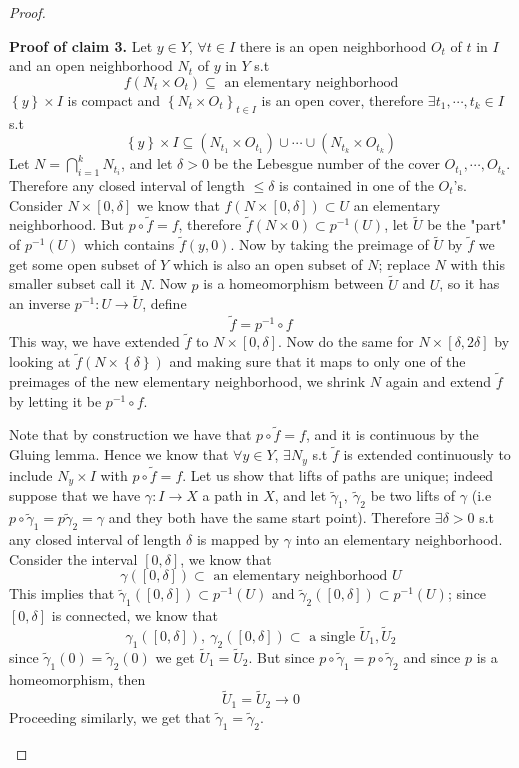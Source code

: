 \documentclass[11pt,a4paper]{article}
\theoremstyle{definition}
\theoremstyle{plain}
\theoremstyle{remark}
\renewcommand{\set}[1]{\left\{ #1 \right\}}
\newcommand{\1}{\mathbbm{1}}
\begin{document}
\begin{proof}
\begin{itemize}
        \textbf{Proof of claim 3.} Let $y \in Y$, $\forall t \in I$ there is an open neighborhood $O_t$ of $t$ in $I$ and an open neighborhood $N_t$ of $y$ in $Y$ s.t 
        $$f(N_t \times O_t) \subseteq \text{ an elementary neighborhood}$$ 
        $\set{y} \times I$ is compact and $\set{N_t \times O_t}_{t \in I}$ is an open cover, therefore $\exists t_1, \cdots, t_k \in I$ s.t
        $$\set{y} \times I \subseteq (N_{t_1} \times O_{t_1}) \cup \cdots \cup (N_{t_k} \times O_{t_k})$$
        Let $N = \bigcap_{i = 1}^k N_{t_i}$, and let $\delta > 0$ be the Lebesgue number of the cover $O_{t_1}, \cdots, O_{t_k}$. Therefore any closed interval of length 
        $\le \delta$ is contained in one of the $O_t$'s. Consider $N \times [0, \delta]$ we know that $f (N \times [0, \delta]) \subset U$ an elementary neighborhood.
        But $p \circ \tilde f = f$, therefore $\tilde f (N \times {0}) \subset p^{-1} (U)$, let $\tilde U$ be the "part" of $p^{-1} (U)$ which contains $\tilde f (y,0)$. Now by taking the preimage 
        of $\tilde U$ by $\tilde f$ we get some open subset of $Y$ which is also an open subset of $N$; replace $N$ with this smaller subset call it $N$. Now $p$ is a homeomorphism between 
        $\tilde U$ and $U$, so it has an inverse $p^{-1} \colon U \to \tilde U$, define 
        $$\tilde f = p^{-1} \circ f$$
        This way, we have extended $\tilde f$ to $N \times [0, \delta]$. Now do the same for $N \times [\delta, 2\delta]$ by looking at $\tilde f (N \times \set{\delta})$ and making sure that 
        it maps to only one of the preimages of the new elementary neighborhood, we shrink $N$ again and extend $\tilde f$ by letting it be $p^{-1} \circ f$.   
        
        Note that by construction we have that $p \circ \tilde f = f$, and it is continuous by the Gluing lemma. Hence we know that $\forall y \in Y$, $\exists N_y$ s.t 
        $\tilde f$ is extended continuously to include $N_y \times I$ with $p \circ \tilde f = f$. Let us show that lifts of paths are unique; indeed suppose that we 
        have $\gamma \colon I \to X$ a path in $X$, and let $\tilde \gamma_1, \ \tilde \gamma_2$ be two lifts of $\gamma$ (i.e $p \circ \tilde \gamma_1 = p \tilde \gamma_2 = \gamma$ and they both have the same start point). 
        Therefore $\exists \delta > 0$ s.t any closed interval of length $\delta$ is mapped by $\gamma$ into an elementary neighborhood. Consider the interval $[0, \delta]$, we know that 
        $$\gamma \left([0,\delta]\right) \subset \text{ an elementary neighborhood $U$}$$ 
        This implies that $\tilde \gamma_1 ([0,\delta]) \subset p^{-1}(U)$ and $\tilde \gamma_2 ([0, \delta]) \subset p^{-1} (U)$; since $[0,\delta]$ is connected, we know that 
        $$\gamma_1 ([0,\delta]), \ \gamma_2 ([0,\delta]) \subset \text{ a single $\tilde U_1, \tilde U_2$}$$
        since $\tilde \gamma_1 (0) = \tilde \gamma_2 (0)$ we get $\tilde U_1 = \tilde U_2$. But since $p \circ \tilde \gamma_1 = p \circ \tilde \gamma_2$ and 
        since $p$ is a homeomorphism, then 
        $$\tilde U_1 = \tilde U_2 \to 0$$
        Proceeding similarly, we get that $\tilde \gamma_1 = \tilde \gamma_2$. 


\end{itemize}
\end{proof}
\end{document}
